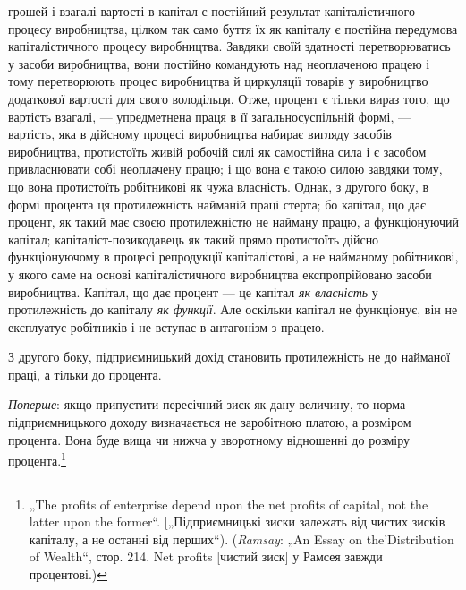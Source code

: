 \parcont{}  %
грошей і взагалі вартості в капітал є постійний результат капіталістичного
процесу виробництва, цілком так само буття їх
як капіталу є постійна передумова капіталістичного процесу
виробництва. Завдяки своїй здатності перетворюватись у засоби
виробництва, вони постійно командують над неоплаченою
працею і тому перетворюють процес виробництва й циркуляції
товарів у виробництво додаткової вартості для свого володільця.
Отже, процент є тільки вираз того, що вартість взагалі, —
упредметнена праця в її загальносуспільній формі, — вартість,
яка в дійсному процесі виробництва набирає вигляду засобів виробництва,
протистоїть живій робочій силі як самостійна сила
і є засобом привласнювати собі неоплачену працю; і що вона є такою
силою завдяки тому, що вона протистоїть робітникові як
чужа власність. Однак, з другого боку, в формі процента ця
протилежність найманій праці стерта; бо капітал, що дає процент,
як такий має своєю протилежністю не найману працю,
а функціонуючий капітал; капіталіст-позикодавець як такий прямо
протистоїть дійсно функціонуючому в процесі репродукції капіталістові,
а не найманому робітникові, у якого саме на основі
капіталістичного виробництва експропрійовано засоби виробництва.
Капітал, що дає процент — це капітал \emph{як власність} у
протилежність до капіталу \emph{як функції}. Але оскільки капітал
не функціонує, він не експлуатує робітників і не вступає в антагонізм
з працею.

З другого боку, підприємницький дохід становить протилежність
не до найманої праці, а тільки до процента.

\emph{Поперше}: якщо припустити пересічний зиск як дану величину,
то норма підприємницького доходу визначається не заробітною
платою, а розміром процента. Вона буде вища чи нижча
у зворотному відношенні до розміру процента.\footnote{
„The profits of enterprise depend upon the net profits of capital, not the
latter upon the former“. [„Підприємницькі зиски залежать від чистих зисків капіталу,
а не останні від перших“). (\emph{Ramsay}: „An Essay on the'Distribution of Wealth“,
стор. 214. Net profits [чистий зиск] у Рамсея завжди \deq{} процентові.)
}

